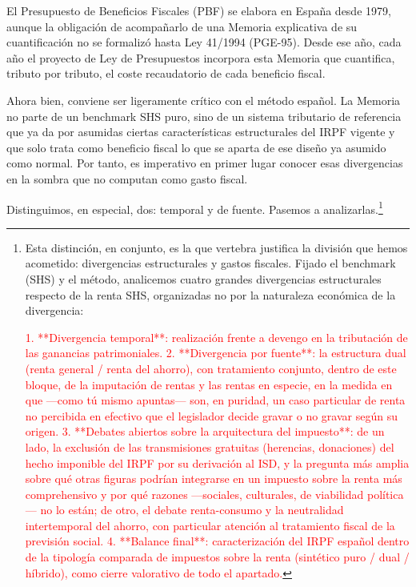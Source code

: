 \documentclass[10pt,a4paper]{article}
\begin{document}
El Presupuesto de Beneficios Fiscales (PBF) se elabora en España desde 1979, aunque la obligación de acompañarlo de una Memoria explicativa de su cuantificación no se formalizó hasta Ley 41/1994 (PGE-95). Desde ese año, cada año el proyecto de Ley de Presupuestos incorpora esta Memoria que cuantifica, tributo por tributo, el coste recaudatorio de cada beneficio fiscal.

Ahora bien, conviene ser ligeramente crítico con el método español. La Memoria no parte de un benchmark SHS puro, sino de un sistema tributario de referencia que ya da por asumidas ciertas características estructurales del IRPF vigente y que solo trata como beneficio fiscal lo que se aparta de ese diseño ya asumido como normal. Por tanto, es imperativo en primer lugar conocer esas divergencias en la sombra que no computan como gasto fiscal.

Distinguimos, en especial, dos: temporal y de fuente. Pasemos a analizarlas.\footnote{%
    Esta distinción, en conjunto, es la que vertebra justifica la división que hemos acometido: divergencias estructurales y gastos fiscales. Fijado el benchmark (SHS) y el método, analicemos cuatro grandes divergencias estructurales respecto de la renta SHS, organizadas no por la naturaleza económica de la divergencia:

\textcolor{red}{1. **Divergencia temporal**: realización frente a devengo en la tributación de las ganancias patrimoniales.
2. **Divergencia por fuente**: la estructura dual (renta general / renta del ahorro), con tratamiento conjunto, dentro de este bloque, de la imputación de rentas y las rentas en especie, en la medida en que —como tú mismo apuntas— son, en puridad, un caso particular de renta no percibida en efectivo que el legislador decide gravar o no gravar según su origen.
3. **Debates abiertos sobre la arquitectura del impuesto**: de un lado, la exclusión de las transmisiones gratuitas (herencias, donaciones) del hecho imponible del IRPF por su derivación al ISD, y la pregunta más amplia sobre qué otras figuras podrían integrarse en un impuesto sobre la renta más comprehensivo y por qué razones —sociales, culturales, de viabilidad política— no lo están; de otro, el debate renta-consumo y la neutralidad intertemporal del ahorro, con particular atención al tratamiento fiscal de la previsión social.
4. **Balance final**: caracterización del IRPF español dentro de la tipología comparada de impuestos sobre la renta (sintético puro / dual / híbrido), como cierre valorativo de todo el apartado.}
}
\end{document}
